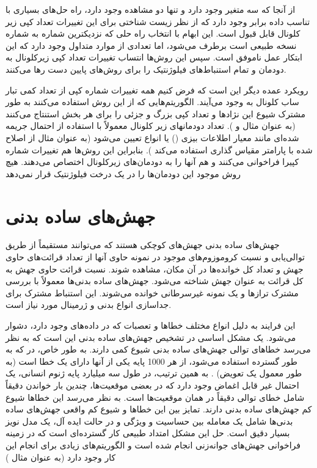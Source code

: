 از آنجا که سه متغیر وجود دارد و تنها دو مشاهده وجود دارد، راه حل‌های بسیاری با تناسب داده برابر وجود دارد که از نظر زیست شناختی برای این تغییرات تعداد کپی زیر کلونال قابل قبول است. این ابهام با انتخاب راه حلی که نزدیکترین شماره به شماره نسخه طبیعی است برطرف می‌شود، اما تعدادی از موارد متداول وجود دارد که این ابتکار عمل ناموفق است. سپس این روش‌ها انتساب تغییرات تعداد کپی زیرکلونال به دودمان و تمام استنباط‌های فیلوژنتیک را برای روش‌های پایین دست رها می‌کنند.


رویکرد عمده دیگر این است که فرض کنیم همه تغییرات شماره کپی از تعداد کمی تبار ساب کلونال به وجود می‌آیند. الگوریتم‌هایی که از این روش استفاده می‌کنند به طور مشترک شیوع این نژادها و تعداد کپی بزرگ و جزئی را برای هر بخش استنتاج می‌کنند (به عنوان مثال \cite{zhu2011metabolic, vander2009understanding} و  ).  تعداد دودمانهای زیر کلونال معمولاً با استفاده از احتمال جریمه شده‌ای مانند معیار اطلاعات بیزی () یا انواع  تعیین می‌شود (به عنوان مثال  از  اصلاح شده با پارامتر مقیاس گذاری استفاده می‌کند \cite{zhu2011metabolic}). بنابراین این روش‌ها هم تغییرات شماره کپیرا فراخوانی می‌کنند و هم آنها را به دودمان‌های زیرکلونال اختصاص می‌دهند. هیچ روش موجود این دودمان‌ها را در یک درخت فیلوژنتیک قرار نمی‌دهد



\section{جهش‌های ساده بدنی }

جهش‌های ساده بدنی جهش‌های کوچکی هستند که می‌توانند مستقیماً از طریق توالی‌یابی و نسبت کروموزوم‌های موجود در نمونه حاوی آنها از تعداد قرائت‌های حاوی جهش و تعداد کل خوانده‌ها در آن مکان، مشاهده شوند. نسبت قرائت حاوی جهش به کل قرائت به عنوان  جهش شناخته می‌شود. جهش‌های ساده بدنی‌ها معمولاً با بررسی مشترک ترازها و یک نمونه غیر‌سرطانی خوانده می‌شوند. این استنباط مشترک برای جداسازی انواع بدنی و ژرمینال مورد نیاز است.

این فرایند به دلیل انواع مختلف خطاها و تعصبات که در داده‌های  وجود دارد، دشوار می‌شود\cite{friedl2010plasticity}. یک مشکل اساسی در تشخیص جهش‌های ساده بدنی این است که به نظر می‌رسد خطاهای توالی جهش‌های ساده بدنی شیوع کمی دارند. به طور خاص، در    که به طور گسترده استفاده می‌شود، از هر 1000 پایه یکی از آنها دارای یک خطا است (به طور معمول یک تعویض) \cite{sabeh2009protease}. به همین ترتیب، در طول سه میلیارد پایه ژنوم انسانی، یک احتمال غیر قابل اغماض وجود دارد که در بعضی موقعیت‌ها، چندین بار خواندن دقیقاً شامل خطای توالی دقیقاً در همان موقعیت‌ها است. به نظر می‌رسد این خطاها شیوع کم جهش‌های ساده بدنی دارند. تمایز بین این خطاها و شیوع کم واقعی جهش‌های ساده بدنی‌ها شامل یک معامله بین حساسیت و ویژگی و در حالت ایده آل، یک مدل نویز بسیار دقیق است. حل این مشکل امتداد طبیعی کار گسترده‌ای است که در زمینه فراخوانی جهش‌های جوانه‌زنی انجام شده است و الگوریتم‌های زیادی برای انجام این کار وجود دارد (به عنوان مثال \cite{friedl2010plasticity, demicheli2008effects})


